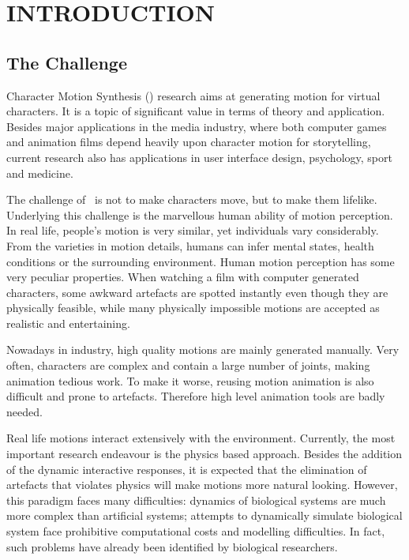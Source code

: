 \chapter{INTRODUCTION}
\label{chap:intro}

\graphicspath{{Introduction/IntroductionFigs/EPS/}{Introduction/IntroductionFigs/}}

\section{The Challenge}
Character Motion Synthesis (\cms) research aims at generating motion for virtual characters.
It is a topic of significant value in terms of theory and application. 
Besides major applications in the media industry, where both computer games and animation films depend heavily upon character motion for storytelling, 
current research also has applications in user interface design, psychology, sport and medicine.

The challenge of \cms\  is not to make characters move, but  to make them lifelike. 
Underlying this challenge is the marvellous human ability of motion perception. 
In real life, people's motion is very similar, yet individuals vary considerably.
From the varieties in motion details, humans can infer mental states, health conditions or the surrounding environment.
Human motion perception has some very peculiar properties.
When watching a film with computer generated characters, some awkward artefacts are spotted instantly even though they are physically feasible, while many physically impossible motions are accepted as realistic and entertaining. 


Nowadays in industry, high quality motions are mainly generated manually. 
Very often, characters are complex and contain a large number of joints, making animation tedious work.
To make it worse, reusing motion animation is also difficult and prone to artefacts.
Therefore high level animation tools are badly needed. 



Real life motions interact extensively with the environment.
Currently, the most important research endeavour is the physics based approach.
Besides  the addition of the dynamic interactive responses, it is  expected that the elimination of  artefacts that violates physics  will make motions more natural looking.
However, this paradigm faces many difficulties:
dynamics of biological systems are much more complex than artificial systems;  attempts to dynamically simulate biological system face prohibitive  computational costs and modelling difficulties.
In fact, such problems have already been identified by biological researchers.







